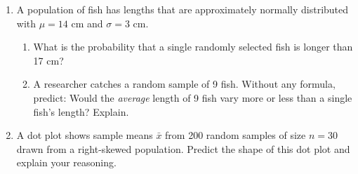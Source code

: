 \documentclass[10pt]{article}
\begin{document}
\namedateperiod

\vspace{0.15in}

\begin{enumerate}

  \item A population of fish has lengths that are approximately normally distributed with
        $\mu = 14$ cm and $\sigma = 3$ cm.
        \begin{enumerate}[label=\alph*.]
          \item What is the probability that a single randomly selected fish is longer than 17 cm?
                \vspace{1.0in}
          \item A researcher catches a random sample of 9 fish. Without any formula, predict:
                Would the \emph{average} length of 9 fish vary more or less than a single fish's
                length? Explain.
        \end{enumerate}

  \item A dot plot shows sample means $\bar{x}$ from 200 random samples of size $n = 30$
        drawn from a right-skewed population. Predict the shape of this dot plot and explain
        your reasoning.

\end{enumerate}
\end{document}

